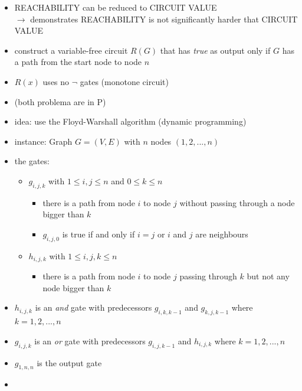 \documentclass[a4]{scrartcl}
\begin{document}
\begin{itemize}
\item REACHABILITY can be reduced to CIRCUIT VALUE \\
$\rightarrow$ demonstrates REACHABILITY is not significantly harder that CIRCUIT VALUE
\item construct a variable-free circuit $R(G)$ that has \textit{true} as output only if $G$ has a path from the start node to node $n$ 
\item $R(x)$ uses no $\lnot$ gates (monotone circuit) 
\item (both problema are in P)
\item idea: use the Floyd-Warshall algorithm (dynamic programming)
\item instance: Graph $G = (V, E)$ with $n$ nodes $(1,2,...,n)$

\item the gates:
\begin{itemize}
\item $g_{i,j,k}$ with $1 \leq i, j \leq n$ and $0 \leq k \leq n$
\begin{itemize}
\item there is a path from node $i$ to node $j$ without passing through a node bigger than $k$
\item $g_{i,j,0}$ is true if and only if $i=j$ or $i$ and $j$ are neighbours
\end{itemize}
\item $h_{i,j,k}$ with $1 \leq i, j, k \leq n$
\begin{itemize}
\item there is a path from node $i$ to node $j$ passing through $k$ but not any node bigger than $k$
\end{itemize}

\end{itemize}

\item $h_{i,j,k}$ is an \textit{and} gate with predecessors $g_{i, k, k-1}$ and $g_{k, j, k-1}$ where $k= 1, 2, ..., n$
\item $g_{i, j, k}$ is an \textit{or} gate with predecessors $g_{i, j, k-1}$ and $h_{i, j, k}$ where $k = 1, 2, ... , n$
\item $g_{1,n,n}$ is the output gate

\item [] \cite{RCV}

\end{itemize}
\end{document}
